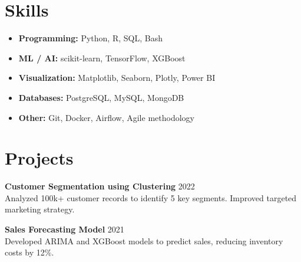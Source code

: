 \documentclass[11pt,a4paper]{article}
\begin{document}
\section*{Skills}
\begin{itemize}[noitemsep]
    \item \textbf{Programming:} Python, R, SQL, Bash
    \item \textbf{ML / AI:} scikit-learn, TensorFlow, XGBoost
    \item \textbf{Visualization:} Matplotlib, Seaborn, Plotly, Power BI
    \item \textbf{Databases:} PostgreSQL, MySQL, MongoDB
    \item \textbf{Other:} Git, Docker, Airflow, Agile methodology
\end{itemize}

\section*{Projects}
\textbf{Customer Segmentation using Clustering} \hfill 2022 \\
Analyzed 100k+ customer records to identify 5 key segments. Improved targeted marketing strategy.

\textbf{Sales Forecasting Model} \hfill 2021 \\
Developed ARIMA and XGBoost models to predict sales, reducing inventory costs by 12\%.
\end{document}
